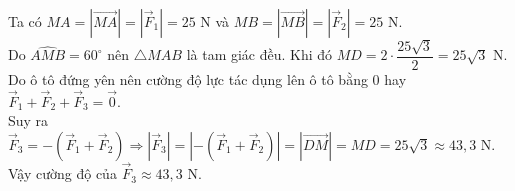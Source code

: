 \begin{ex}
{	Ta có $MA=\left|\overrightarrow{MA}\right|=\left|\vec{F}_1\right|=25$ N và $MB=\left|\overrightarrow{MB}\right|=\left|\vec{F}_2\right|=25$ N.\\
	Do $\widehat{AMB}=60^{\circ}$ nên $\triangle MAB$ là tam giác đều. Khi đó $MD=2\cdot\dfrac{25\sqrt{3}}{2}=25\sqrt{3}$ N.\\
	Do ô tô đứng yên nên cường độ lực tác dụng lên ô tô bằng $0$ hay $\vec{F}_1+\vec{F}_2+\vec{F}_3=\vec{0}$.\\
	Suy ra $\vec{F}_3=-\left(\vec{F}_1+\vec{F}_2\right)\Rightarrow\left|\vec{F}_3\right|=\left|-\left(\vec{F}_1+\vec{F}_2\right)\right|=\left|\overrightarrow{DM}\right|=MD=25\sqrt{3}\approx 43{,}3$ N.\\
	Vậy cường độ của $\vec{F}_3\approx 43{,}3$ N.}
\end{ex}


